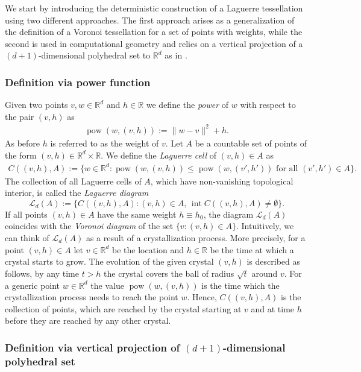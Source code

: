 \documentclass[11pt,a4paper]{article}
\theoremstyle{plain}
\theoremstyle{definition}
\theoremstyle{remark}
\def\RR{\mathbb{R}}
\def\cL{\mathcal{L}}
\newcommand{\pow}{\mathop{\mathrm{pow}}\nolimits}
\newcommand{\inter}{\operatorname{int}}
\begin{document}
We start by introducing the deterministic construction of a Laguerre tessellation using two different approaches. The first approach arises as a generalization of the definition of a Voronoi tessellation for a set of points with weights, while the second is used in computational geometry and relies on a vertical projection of a $(d+1)$-dimensional polyhedral set to $\RR^d$ as in \cite{BY98}. 

\subsubsection{Definition via power function} \label{sec:ConstructionStandard}

Given two points $v, w \in \RR^d$ and $h \in \RR$ we define the \textit{power} of $w$ with respect to the pair $(v,h)$ as
\begin{align}
    \pow\left(w,(v,h)\right) := \|w-v\|^2 + h.\label{eq:PowerFunction}
\end{align} 
As before $h$ is referred to as the weight of $v$. Let $A$ be a countable set of points of the form $(v,h) \in \RR^d\times \RR$. We define the \textit{Laguerre cell} of 
$(v,h) \in A$ as
\begin{align*}
    C\left((v,h), A\right) := \big\{w \in \RR^d: \pow(w,(v,h)) \le \pow(w,(v',h')) \text{ for all } (v',h') \in A\big\}. 
\end{align*} 
The collection of all Laguerre cells of $A$, which have non-vanishing topological interior, is called the \textit{Laguerre diagram}
\[
    \cL_d(A):=\{C((v,h),A)\colon (v,h)\in A,\, \inter{C((v,h),A)}\neq\emptyset \}.
\]
If all points $(v,h)\in A$ have the same weight $h\equiv h_0$, the diagram $\cL_d(A)$ coincides with the \textit{Voronoi diagram} of the set $\{v\colon (v,h)\in A\}$. Intuitively, we can think of $\cL_d(A)$ as a result of a crystallization process. More precisely, for a point $(v,h)\in A$ let $v\in \RR^d$ be the location and $h\in \RR$ be the time at which a crystal starts to grow. The evolution of the given crystal $(v,h)$ is described as follows, by any time $t>h$ the crystal covers the ball of radius $\sqrt{t}$ around $v$. For a generic point $w\in \RR^d$ the value $\pow(w,(v,h))$ is the time 
 which the crystallization process needs to reach the point $w$. Hence, $C((v,h),A)$ is the collection of points, which are reached by the crystal starting at $v$ and at time $h$ before they are reached by any other crystal.

 \subsubsection{Definition via vertical projection of \texorpdfstring{$(d+1)$}{}-dimensional polyhedral set}\label{sec:polyhedral}
\end{document}
